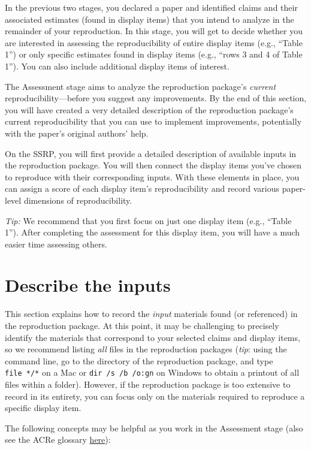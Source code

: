 \documentclass[
]{book}
\begin{document}
In the previous two stages, you declared a paper and identified claims and their associated estimates (found in display items) that you intend to analyze in the remainder of your reproduction. In this stage, you will get to decide whether you are interested in assessing the reproducibility of entire display items (e.g., ``Table 1'') or only specific estimates found in display items (e.g., ``rows 3 and 4 of Table 1''). You can also include additional display items of interest.

The Assessment stage aims to analyze the reproduction package's \emph{current} reproducibility---before you suggest any improvements. By the end of this section, you will have created a very detailed description of the reproduction package's current reproducibility that you can use to implement improvements, potentially with the paper's original authors' help.

On the SSRP, you will first provide a detailed description of available inputs in the reproduction package. You will then connect the display items you've chosen to reproduce with their corresponding inputs. With these elements in place, you can assign a score of each display item's reproducibility and record various paper-level dimensions of reproducibility.

\emph{Tip:} We recommend that you first focus on just one display item (e.g., ``Table 1''). After completing the assessment for this display item, you will have a much easier time assessing others.

\hypertarget{describe-inputs}{%
\section{Describe the inputs}\label{describe-inputs}}

This section explains how to record the \emph{input} materials found (or referenced) in the reproduction package. At this point, it may be challenging to precisely identify the materials that correspond to your selected claims and display items, so we recommend listing \emph{all} files in the reproduction packages (\emph{tip}: using the command line, go to the directory of the reproduction package, and type \texttt{file\ */*} on a Mac or \texttt{dir\ /s\ /b\ /o:gn} on Windows to obtain a printout of all files within a folder). However, if the reproduction package is too extensive to record in its entirety, you can focus only on the materials required to reproduce a specific display item.

The following concepts may be helpful as you work in the Assessment stage (also see the ACRe glossary \href{https://bitss.github.io/ACRE/definitions.html}{here}):
\end{document}
